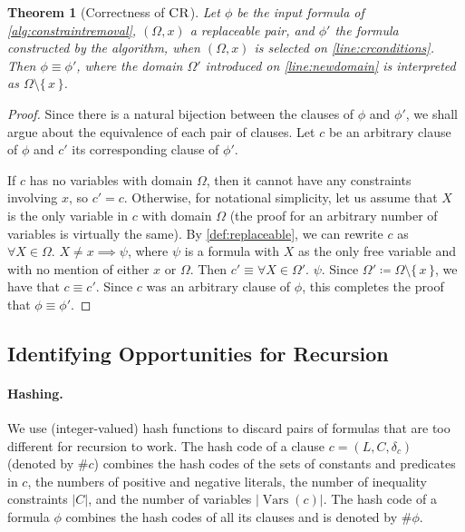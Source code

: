 \documentclass{article}
\newtheorem{theorem}{Theorem}
\theoremstyle{definition}
\DeclareMathOperator{\CR}{\textsc{CR}}
\DeclareMathOperator{\Vars}{Vars}
\begin{document}
\begin{theorem}[Correctness of $\CR$]
  Let $\phi$ be the input formula of \cref{alg:constraintremoval}, $(\Omega, x)$
  a replaceable pair, and $\phi'$ the formula constructed by the algorithm, when
  $(\Omega, x)$ is selected on \cref{line:crconditions}. Then
  $\phi \equiv \phi'$, where the domain $\Omega'$ introduced on
  \cref{line:newdomain} is interpreted as $\Omega \setminus \{\, x \,\}$.
\end{theorem}
\begin{proof}
  Since there is a natural bijection between the clauses of $\phi$ and $\phi'$,
  we shall argue about the equivalence of each pair of clauses. Let $c$ be an
  arbitrary clause of $\phi$ and $c'$ its corresponding clause of $\phi'$.

  If $c$ has no variables with domain $\Omega$, then it cannot have any
  constraints involving $x$, so $c' = c$. Otherwise, for notational simplicity,
  let us assume that $X$ is the only variable in $c$ with domain $\Omega$ (the
  proof for an arbitrary number of variables is virtually the same). By
  \cref{def:replaceable}, we can rewrite $c$ as $\forall X \in \Omega\text{.
  } X \ne x \implies \psi$, where $\psi$ is a formula with $X$ as the only free
  variable and with no mention of either $x$ or $\Omega$. Then
  $c' \equiv \forall X \in \Omega'\text{. } \psi$. Since
  $\Omega' \coloneqq \Omega \setminus \{\, x \,\}$, we have that $c \equiv c'$.
  Since $c$ was an arbitrary clause of $\phi$, this completes the proof that
  $\phi \equiv \phi'$.
\end{proof}

\subsection{Identifying Opportunities for Recursion}\label{sec:ref}

\paragraph{Hashing.}
We use (integer-valued) hash functions to discard pairs of formulas that are too
different for recursion to work. The hash code of a clause
$c = (L, C, \delta_{c})$ (denoted by $\# c$) combines the hash codes of the sets
of constants and predicates in $c$, the numbers of positive and negative
literals, the number of inequality constraints $|C|$, and the number of
variables $|\Vars(c)|$. The hash code of a formula $\phi$ combines the hash
codes of all its clauses and is denoted by $\#\phi$.
\end{document}

